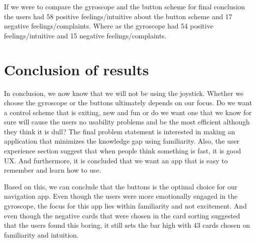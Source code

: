 If we were to compare the gyroscope and the button scheme for final conclusion the users had 58 positive feelings/intuitive about the button scheme and 17 negative feelings/complaints. Where as the gyroscope had 54 positive feelings/intuitive and 15 negative feelings/complaints. 

\section{Conclusion of results}

In conclusion, we now know that we will not be using the joystick. Whether we choose the gyroscope or the buttons ultimately depends on our focus. Do we want a control scheme that is exiting, new and fun or do we want one that we know for sure will cause the users no usability problems and be the most efficient although they think it is dull? 
The final problem statement is interested in making an application that minimizes the knowledge gap using familiarity. %
Also, the user experience section suggest that when people think something is fast, it is good UX. \pageref{EvalConFast} And furthermore, it is concluded that we want an app that is easy to remember and learn how to use. \pageref{EvalConUsability}

Based on this, we can conclude that the buttons is the optimal choice for our navigation app. Even though the users were more emotionally engaged in the gyroscope, the focus for this app lies within familiarity and not excitement. And even though the negative cards that were chosen in the card sorting suggested that the users found this boring, it still sets the bar high with 43 cards chosen on familiarity and intuition.
 

